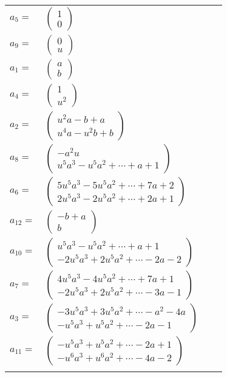 \documentclass[1p]{elsarticle_modified}
\theoremstyle{definition}
\begin{document}
\begin{tabular}{m{7pt} m{180pt} m{7pt} m{180pt} }
\flushright $a_{5}=$&$\begin{pmatrix}1\\0\end{pmatrix}$ \\
\flushright $a_{9}=$&$\begin{pmatrix}0\\u\end{pmatrix}$ \\
\flushright $a_{1}=$&$\begin{pmatrix}a\\b\end{pmatrix}$ \\
\flushright $a_{4}=$&$\begin{pmatrix}1\\u^2\end{pmatrix}$ \\
\flushright $a_{2}=$&$\begin{pmatrix}u^2 a- b+a\\u^4 a- u^2 b+b\end{pmatrix}$ \\
\flushright $a_{8}=$&$\begin{pmatrix}- a^2 u\\u^5 a^3- u^5 a^2+\cdots+a+1\end{pmatrix}$ \\
\flushright $a_{6}=$&$\begin{pmatrix}5 u^5 a^3-5 u^5 a^2+\cdots+7 a+2\\2 u^5 a^3-2 u^5 a^2+\cdots+2 a+1\end{pmatrix}$ \\
\flushright $a_{12}=$&$\begin{pmatrix}- b+a\\b\end{pmatrix}$ \\
\flushright $a_{10}=$&$\begin{pmatrix}u^5 a^3- u^5 a^2+\cdots+a+1\\-2 u^5 a^3+2 u^5 a^2+\cdots-2 a-2\end{pmatrix}$ \\
\flushright $a_{7}=$&$\begin{pmatrix}4 u^5 a^3-4 u^5 a^2+\cdots+7 a+1\\-2 u^5 a^3+2 u^5 a^2+\cdots-3 a-1\end{pmatrix}$ \\
\flushright $a_{3}=$&$\begin{pmatrix}-3 u^5 a^3+3 u^5 a^2+\cdots- a^2-4 a\\- u^5 a^3+u^5 a^2+\cdots-2 a-1\end{pmatrix}$ \\
\flushright $a_{11}=$&$\begin{pmatrix}- u^5 a^3+u^5 a^2+\cdots-2 a+1\\- u^6 a^3+u^6 a^2+\cdots-4 a-2\end{pmatrix}$\\&\end{tabular}
\end{document}
